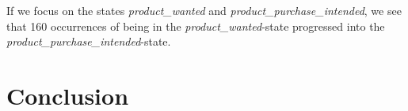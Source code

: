         If we focus on the states \emph{product\_wanted} and \emph{product\_purchase\_intended}, we see that 160 occurrences of being in the \emph{product\_wanted}-state progressed into the \emph{product\_purchase\_intended}-state.










\section{Conclusion}
\label{sec:dataset-conclusion}


